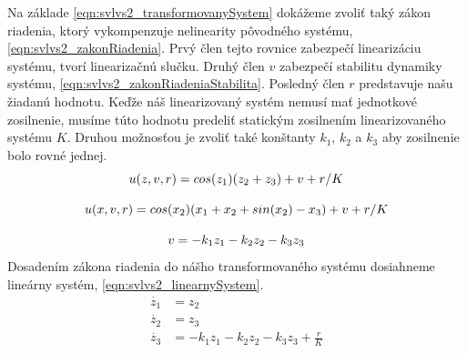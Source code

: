 \documentclass[../main.tex]{subfiles}
\begin{document}
Na základe \cref{eqn:svlvs2_transformovanySystem} dokážeme zvoliť taký zákon riadenia, ktorý vykompenzuje nelinearity pôvodného systému,  \cref{eqn:svlvs2_zakonRiadenia}. Prvý člen tejto rovnice zabezpečí linearizáciu systému, tvorí linearizačnú slučku. Druhý člen $v$ zabezpečí stabilitu dynamiky systému, \cref{eqn:svlvs2_zakonRiadeniaStabilita}. Posledný člen $r$ predstavuje našu žiadanú hodnotu. Keďže náš linearizovaný systém nemusí mať jednotkové zosilnenie, musíme túto hodnotu predeliť statickým zosilnením linearizovaného systému $K$. Druhou možnosťou je zvoliť také konštanty $k_1$, $k_2$ a $k_3$ aby zosilnenie bolo rovné jednej.
	\begin{equation}
		u(z,v,r) = cos(z_1)(z_2+z_3) + v + r/K										\\
		\label{eqn:svlvs2_zakonRiadenia}
	\end{equation}

	\begin{equation}
		u(x,v,r) = cos(x_2)(x_1 + x_2+sin(x_2) - x_3) + v + r/K										\\
		\label{eqn:svlvs2_zakonRiadeniaX}
	\end{equation}

	\begin{equation}
		v = -k_1 z_1 - k_2 z_2 -k_3 z_3										\\
		\label{eqn:svlvs2_zakonRiadeniaStabilita}
	\end{equation}
Dosadením zákona riadenia do nášho transformovaného systému dosiahneme lineárny systém, \cref{eqn:svlvs2_linearnySystem}.
	\begin{equation}
		\begin{aligned}
		\dot{z_1} &=  z_2												\\
		\dot{z_2} &=  z_3												\\
		\dot{z_3} &=   -k_1 z_1 - k_2 z_2 -k_3 z_3 + \frac{r}{K}					\\
		\end{aligned}
		\label{eqn:svlvs2_linearnySystem}
	\end{equation}
\end{document}
